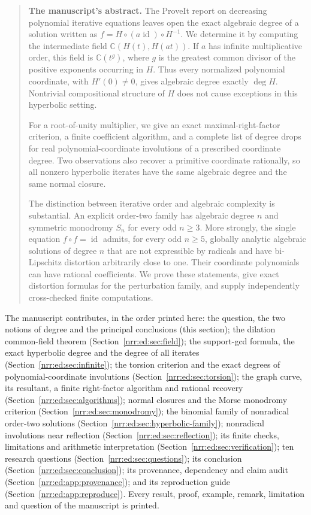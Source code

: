 \documentclass[11pt,letterpaper]{article}
\theoremstyle{definition}
\theoremstyle{remark}
\newcommand{\C}{\mathbb C}
\newcommand{\id}{\operatorname{id}}
\begin{document}
\begin{quote}\small
\textbf{The manuscript's abstract.} The ProveIt report on decreasing
polynomial iterative equations leaves open the exact algebraic degree of a
solution written as $f=H\circ(a\id)\circ H^{-1}$. We determine it by
computing the intermediate field $\C(H(t),H(at))$. If $a$ has infinite
multiplicative order, this field is $\C(t^g)$, where $g$ is the greatest
common divisor of the positive exponents occurring in $H$. Thus every
normalized polynomial coordinate, with $H'(0)\ne0$, gives algebraic degree
exactly $\deg H$. Nontrivial compositional structure of $H$ does not cause
exceptions in this hyperbolic setting.

For a root-of-unity multiplier, we give an exact maximal-right-factor
criterion, a finite coefficient algorithm, and a complete list of degree
drops for real polynomial-coordinate involutions of a prescribed coordinate
degree. Two observations also recover a primitive coordinate rationally, so
all nonzero hyperbolic iterates have the same algebraic degree and the same
normal closure.

The distinction between iterative order and algebraic complexity is
substantial. An explicit order-two family has algebraic degree $n$ and
symmetric monodromy $S_n$ for every odd $n\ge3$. More strongly, the single
equation $f\circ f=\id$ admits, for every odd $n\ge5$, globally analytic
algebraic solutions of degree $n$ that are not expressible by radicals and
have bi-Lipschitz distortion arbitrarily close to one. Their coordinate
polynomials can have rational coefficients. We prove these statements, give
exact distortion formulas for the perturbation family, and supply
independently cross-checked finite computations.
\end{quote}

The manuscript contributes, in the order printed here: the question, the two
notions of degree and the principal conclusions (this section); the dilation
common-field theorem (Section~\ref{nrr:ed:sec:field}); the support-gcd
formula, the exact hyperbolic degree and the degree of all iterates
(Section~\ref{nrr:ed:sec:infinite}); the torsion criterion and the exact
degrees of polynomial-coordinate involutions
(Section~\ref{nrr:ed:sec:torsion}); the graph curve, its resultant, a finite
right-factor algorithm and rational recovery
(Section~\ref{nrr:ed:sec:algorithms}); normal closures and the Morse
monodromy criterion (Section~\ref{nrr:ed:sec:monodromy}); the binomial
family of nonradical order-two solutions
(Section~\ref{nrr:ed:sec:hyperbolic-family}); nonradical involutions near
reflection (Section~\ref{nrr:ed:sec:reflection}); its finite checks,
limitations and arithmetic interpretation
(Section~\ref{nrr:ed:sec:verification}); ten research questions
(Section~\ref{nrr:ed:sec:questions}); its conclusion
(Section~\ref{nrr:ed:sec:conclusion}); its provenance, dependency and claim
audit (Section~\ref{nrr:ed:app:provenance}); and its reproduction guide
(Section~\ref{nrr:ed:app:reproduce}). Every result, proof, example, remark,
limitation and question of the manuscript is printed.
\end{document}
